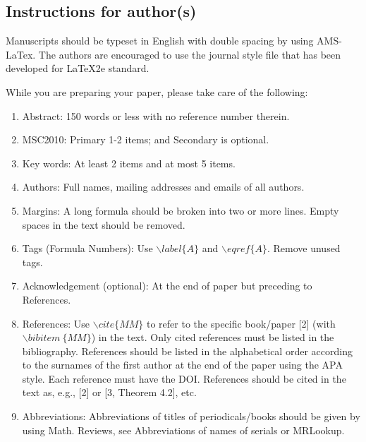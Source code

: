 \documentclass{article}
\begin{document}
\subsection{Instructions for author(s)}

Manuscripts should be typeset in English with double spacing by
using AMS-LaTex. The authors are encouraged to use the journal style
file that has been developed for LaTeX2e standard.

While you are preparing your paper, please take care of the
following:
\begin{enumerate}
\item Abstract: 150 words or less with no reference number therein.\\
\item MSC2010: Primary 1-2 items; and Secondary is optional.\\

\item Key words: At least 2 items and at most 5 items.\\
\item Authors: Full names, mailing addresses and emails of all authors.\\
\item Margins: A long formula should be broken into two or more lines. Empty spaces in the text should be removed.\\
\item Tags (Formula Numbers): Use $\backslash label\{A\}$ and $\backslash eqref\{A\}$. Remove unused tags. \\
\item Acknowledgement (optional): At the end of paper but preceding to References.\\
\item References: Use $\backslash cite\{MM\}$ to refer to the specific book/paper [2] (with $\backslash bibitem~\{MM\}$) in the text. Only cited references must be listed in the bibliography. References should be listed in the alphabetical order according to the surnames of the first author at the end of the paper using the APA style. Each reference must have the DOI.
References should be cited in the text as, e.g., [2] or [3, Theorem 4.2], etc.  \\
\item Abbreviations: Abbreviations of titles of periodicals/books should be given by using Math. Reviews, see Abbreviations of names of serials or MRLookup.

\end{enumerate}
\end{document}
